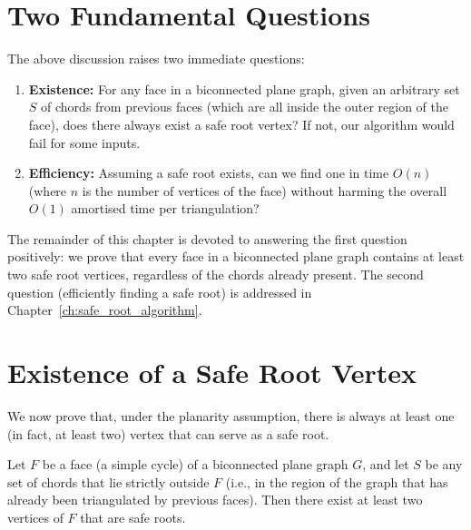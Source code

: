 \section{Two Fundamental Questions}
\label{sec:two_questions}

The above discussion raises two immediate questions:

\begin{enumerate}
    \item \textbf{Existence:} For any face in a biconnected plane graph, given an arbitrary set \(S\) of chords from previous faces (which are all inside the outer region of the face), does there always exist a safe root vertex? 
    If not, our algorithm would fail for some inputs.
    
    \item \textbf{Efficiency:} Assuming a safe root exists, can we find one in time \(O(n)\) (where \(n\) is the number of vertices of the face) without harming the overall \(O(1)\) amortised time per triangulation?
\end{enumerate}

The remainder of this chapter is devoted to answering the first question positively: we prove that every face in a biconnected plane graph contains at least two safe root vertices, regardless of the chords already present. 
The second question (efficiently finding a safe root) is addressed in Chapter~\ref{ch:safe_root_algorithm}.

\section{Existence of a Safe Root Vertex}
\label{sec:existence_proof}

We now prove that, under the planarity assumption, there is always at least one (in fact, at least two) vertex that can serve as a safe root.

\begin{theorem}
    \label{thm:safe_root_exists}
    Let \(F\) be a face (a simple cycle) of a biconnected plane graph \(G\), and let \(S\) be any set of chords that lie strictly outside \(F\) (i.e., in the region of the graph that has already been triangulated by previous faces). 
    Then there exist at least two vertices of \(F\) that are safe roots.
\end{theorem}

